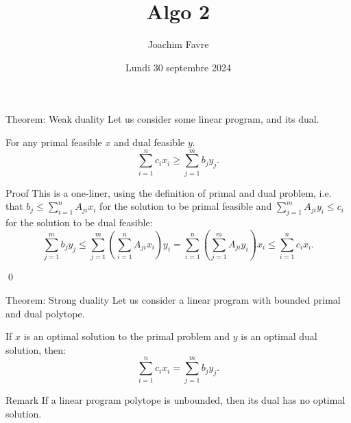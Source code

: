 \documentclass[a4paper]{article}
\title{Algo 2}
\author{Joachim Favre}
\date{Lundi 30 septembre 2024}
\begin{document}
\maketitle


\begin{parag}{Theorem: Weak duality}
    Let us consider some linear program, and its dual.

    For any primal feasible $x$ and dual feasible $y$.
    \[\sum_{i=1}^{n} c_i x_i \geq \sum_{j=1}^{m} b_j y_j.\]

    \begin{subparag}{Proof}
        This is a one-liner, using the definition of primal and dual problem, i.e. that $b_j \leq \sum_{i=1}^{n} A_{ji} x_i$ for the solution to be primal feasible and $\sum_{j=1}^{m} A_{ji} y_i \leq c_i$ for the solution to be dual feasible:
        \[\sum_{j=1}^{m} b_j y_j \leq \sum_{j=1}^{m} \left(\sum_{i=1}^{n} A_{ji} x_i \right) y_i = \sum_{i=1}^{n} \left(\sum_{j=1}^{m} A_{ji} y_i\right) x_i \leq \sum_{i=1}^{n} c_i x_i.\]

        \qed
    \end{subparag}
\end{parag}

\begin{parag}{Theorem: Strong duality}
    Let us consider a linear program with bounded primal and dual polytope.

    If $x$ is an optimal solution to the primal problem and $y$ is an optimal dual solution, then: 
    \[\sum_{i=1}^{n} c_i x_i = \sum_{j=1}^{m} b_j y_j.\]

    \begin{subparag}{Remark}
        If a linear program polytope is unbounded, then its dual has no optimal solution.
    \end{subparag}
\end{parag}
\end{document}
